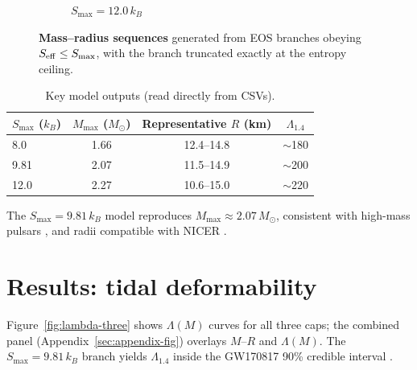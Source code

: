 \documentclass[11pt]{article}
\begin{document}
\begin{figure}[h!]
\begin{subfigure}[t]{0.32\textwidth}
\caption{$S_{\max}=12.0\,k_B$}
\end{subfigure}
\caption{\textbf{Mass–radius sequences} generated from EOS branches obeying $S_{\rm eff}\le S_{\max}$, with the branch truncated exactly at the entropy ceiling.}
\label{fig:mr}
\end{figure}

\begin{table}[h!]
\centering
\small
\caption{Key model outputs (read directly from CSVs).}
\label{tab:key}
\begin{tabular}{lccc}
\toprule
$S_{\max}$ ($k_B$) & $M_{\max}$ ($M_\odot$) & Representative $R$ (km) & $\Lambda_{1.4}$\\
\midrule
8.0  & 1.66 & 12.4--14.8 & $\sim$180 \\
9.81 & 2.07 & 11.5--14.9 & $\sim$200 \\
12.0 & 2.27 & 10.6--15.0 & $\sim$220 \\
\bottomrule
\end{tabular}
\end{table}

The $S_{\max}=9.81\,k_B$ model reproduces $M_{\max}\approx2.07\,M_\odot$, consistent with high-mass pulsars \cite{Demorest2010,Antoniadis2013,Cromartie2020}, and radii compatible with NICER \cite{Riley2019}.

\section{Results: tidal deformability}
\label{sec:lambda}
Figure~\ref{fig:lambda-three} shows $\Lambda(M)$ curves for all three caps; the combined panel (Appendix~\ref{sec:appendix-fig}) overlays $M$–$R$ and $\Lambda(M)$. The $S_{\max}=9.81\,k_B$ branch yields $\Lambda_{1.4}$ inside the GW170817 90\% credible interval \cite{Abbott2018GW170817}.
\end{document}

